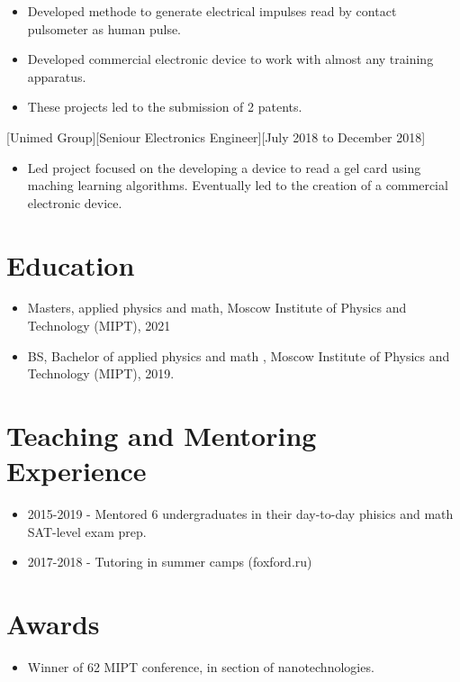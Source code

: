 \documentclass{article}
\begin{document}
\begin{itemize}
\item Developed methode to generate electrical impulses read by contact pulsometer as human pulse.
\item Developed commercial electronic device to work with almost any training apparatus.
\item These projects led to the submission of 2 patents.
\end{itemize}

[Unimed Group][Seniour Electronics Engineer][July 2018 to December 2018]

\begin{itemize}
\item Led project focused on the developing a device to read a gel card using maching learning algorithms. Eventually led to the creation of a commercial electronic device.
\end{itemize}


\section{Education}

\begin{itemize}
\item Masters, applied physics and math, Moscow Institute of Physics and Technology (MIPT), 2021
\item BS, Bachelor of applied physics and math , Moscow Institute of Physics and Technology (MIPT), 2019.
\end{itemize}

\section{Teaching and Mentoring Experience }
\begin{itemize}
\item 2015-2019 - Mentored 6 undergraduates in their day-to-day phisics and math SAT-level exam prep.
\item 2017-2018 - Tutoring in summer camps (foxford.ru)
\end{itemize}

\section{Awards}
\begin{itemize}
\item Winner of 62 MIPT conference, in section of nanotechnologies.
\end{itemize}
\end{document}
